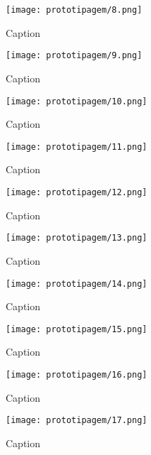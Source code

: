 \documentclass[
	article,			%
	12pt,				%
	oneside,			%
	a4paper,			%
	english,			%
	brazil,				%
	sumario=tradicional
	]{abntex2}
\begin{document}
\begin{apendicesenv}
\begin{figure}
    \centering
    \texttt{[image: prototipagem/8.png]}
    \caption{Caption}
    \label{fig:enter-label}
\end{figure}

\begin{figure}
    \centering
    \texttt{[image: prototipagem/9.png]}
    \caption{Caption}
    \label{fig:enter-label}
\end{figure}

\begin{figure}
    \centering
    \texttt{[image: prototipagem/10.png]}
    \caption{Caption}
    \label{fig:enter-label}
\end{figure}

\begin{figure}
    \centering
    \texttt{[image: prototipagem/11.png]}
    \caption{Caption}
    \label{fig:enter-label}
\end{figure}

\begin{figure}
    \centering
    \texttt{[image: prototipagem/12.png]}
    \caption{Caption}
    \label{fig:enter-label}
\end{figure}

\begin{figure}
    \centering
    \texttt{[image: prototipagem/13.png]}
    \caption{Caption}
    \label{fig:enter-label}
\end{figure}

\begin{figure}
    \centering
    \texttt{[image: prototipagem/14.png]}
    \caption{Caption}
    \label{fig:enter-label}
\end{figure}

\begin{figure}
    \centering
    \texttt{[image: prototipagem/15.png]}
    \caption{Caption}
    \label{fig:enter-label}
\end{figure}

\begin{figure}
    \centering
    \texttt{[image: prototipagem/16.png]}
    \caption{Caption}
    \label{fig:enter-label}
\end{figure}

\begin{figure}
    \centering
    \texttt{[image: prototipagem/17.png]}
    \caption{Caption}
    \label{fig:enter-label}
\end{figure}


\end{apendicesenv}
\end{document}
